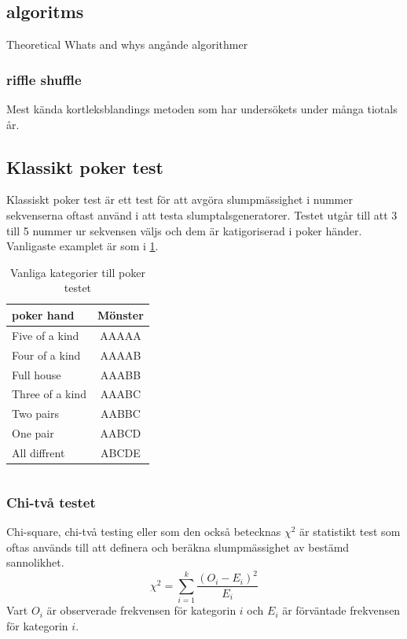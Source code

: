\documentclass[swedish,a4paper]{article}
\begin{document}
\subsection{algoritms}
Theoretical Whats and whys angånde algorithmer

\subsubsection{riffle shuffle}
Mest kända kortleksblandings metoden som har undersökets under många tiotals år.


\subsection{Klassikt poker test}
Klassiskt poker test är ett test för att avgöra slump\-mässighet i nummer 
sekvenserna oftast använd i att testa slumptalsgeneratorer. Testet utgår till
att 3 till 5 nummer ur sekvensen väljs och dem är katigoriserad i poker
händer. Vanligaste examplet är som i \cref{tab:num_poker_hands}.

\begin{table}[h] %
	\centering
	\begin{tabular}{|l|c|}
	\hline 
	poker hand & Mönster \\ \hline  
	Five of a kind & AAAAA \\ \hline
	Four of a kind & AAAAB \\ \hline
	Full house & AAABB \\ \hline
	Three of a kind & AAABC \\ \hline
	Two pairs & AABBC \\ \hline
	One pair & AABCD \\ \hline
	All diffrent & ABCDE \\ \hline
	
\end{tabular}
\caption{Vanliga kategorier till poker testet}
\label{tab:num_poker_hands}
\end{table}

\begin{equation*}
\end{equation*}

\subsubsection{Chi-två testet}
\label{sec:chi_square}
Chi-square, chi-två testing eller som den också betecknas $\chi^2$ är statistikt test
som oftas används till att definera och beräkna slumpmässighet av bestämd sannolikhet.
$$ \chi^2 = \sum_{i=1}^k \frac{(O_i - E_i)^2}{E_i}$$
Vart $O_i$ är observerade frekvensen för kategorin $i$ och $E_i$ är förväntade
frekvensen för kategorin $i$.
\end{document}
